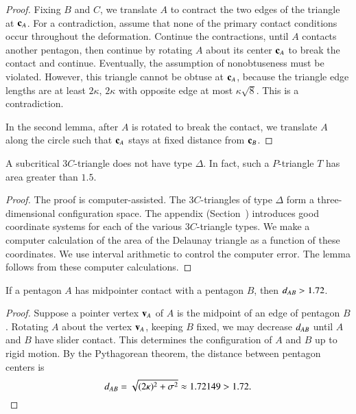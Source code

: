 \begin{proof} Fixing $B$ and $C$, we translate $A$ to contract the two
  edges of the triangle at ${\mathbf c}_A$.  For a contradiction, assume that
  none of the primary contact conditions occur throughout the
  deformation.  Continue the contractions, until $A$ contacts another
  pentagon, then continue by rotating $A$ about its center ${\mathbf c}_A$ to
  break the contact and continue.  Eventually, the assumption of
  nonobtuseness must be violated.  However, this triangle cannot be
  obtuse at ${\mathbf c}_A$, because the triangle edge lengths are at least $2
  \kappa$, $2 \kappa$ with opposite edge at most
  $\kappa\sqrt{8}$. This is a contradiction.

  In the second lemma, after $A$ is rotated to break the contact, we translate
  $A$ along the circle such that ${\mathbf c}_A$ stays at fixed distance from ${\mathbf c}_B$.
\end{proof}

\begin{lemma} A subcritical $3C$-triangle does not have type $\Delta$.
  In fact, such a $P$-triangle $T$ has area greater than $1.5$.
\end{lemma}

\begin{proof} The proof is computer-assisted.  The $3C$-triangles of
  type $\Delta$ form a three-dimensional configuration space.  The
  appendix (Section~) introduces good coordinate
  systems for each of the various $3C$-triangle types.  We make a
  computer calculation of the area of the Delaunay triangle as a
  function of these coordinates.  We use interval arithmetic to
  control the computer error.  The lemma follows from these computer
  calculations.
\end{proof}



\begin{lemma}  
  If a pentagon $A$ has midpointer contact with a pentagon $B$, then
  $d_{AB} > 1.72$.
\end{lemma}

\begin{proof} Suppose a pointer vertex ${\mathbf v}_A$ of $A$ is the midpoint of an
  edge of pentagon $B$.  Rotating $A$ about the vertex ${\mathbf v}_A$, keeping
  $B$ fixed, we may decrease $d_{AB}$ until $A$ and $B$
  have slider contact.  This determines the configuration of $A$ and
  $B$ up to rigid motion.  By the Pythagorean theorem, the
  distance between pentagon centers is
\[
d_{AB} = \sqrt{(2\kappa)^2 + \sigma^2} \approx 1.72149 > 1.72.
\] %
\end{proof}

